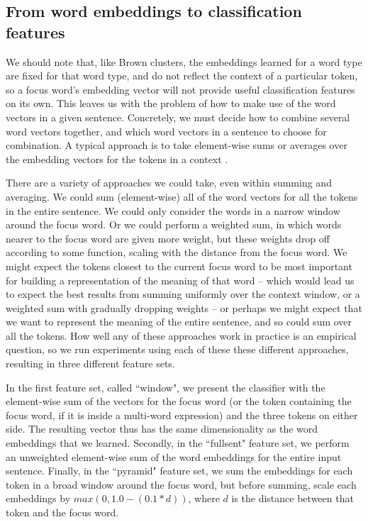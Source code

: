 \subsection{From word embeddings to classification features}
We should note that, like Brown clusters, the embeddings learned for a word
type are fixed for that word type, and do not reflect the context of a
particular token, so a focus word's embedding vector will not provide useful
classification features on its own. This leaves us with the problem of how to
make use of the word vectors in a given sentence. Concretely, we must decide
how to combine several word vectors together, and which word vectors in a
sentence to choose for combination. A typical approach is to take element-wise
sums or averages over the embedding vectors for the tokens in a context
\cite[Chapter 8]{Goldberg17}.

There are a variety of approaches we could take, even within summing and
averaging. We could sum (element-wise) all of the word vectors for all the
tokens in the entire sentence. We could only consider the words in a narrow
window around the focus word. Or we could perform a weighted sum, in which
words nearer to the focus word are given more weight, but these weights drop
off according to some function, scaling with the distance from the focus word.
We might expect the tokens closest to the current focus word to be most
important for building a representation of the meaning of that word -- which
would lead us to expect the best results from summing uniformly over the
context window, or a weighted sum with gradually dropping weights -- or perhaps
we might expect that we want to represent the meaning of the entire sentence,
and so could sum over all the tokens.
How well any of these approaches work in practice is an empirical question, so
we run experiments using each of these these different approaches, resulting in
three different feature sets.

In the first feature set, called ``window", we present the classifier with the
element-wise sum of the vectors for the focus word (or the token containing the
focus word, if it is inside a multi-word expression) and the three tokens on
either side. The resulting vector thus has the same dimensionality as the word
embeddings that we learned. Secondly, in the ``fullsent" feature set, we
perform an unweighted element-wise sum of the word embeddings for the entire
input sentence. Finally, in the ``pyramid" feature set, we sum the embeddings
for each token in a broad window around the focus word, but before summing,
scale each embeddings by $max(0, 1.0 - (0.1 * d))$, where $d$ is the distance
between that token and the focus word.

